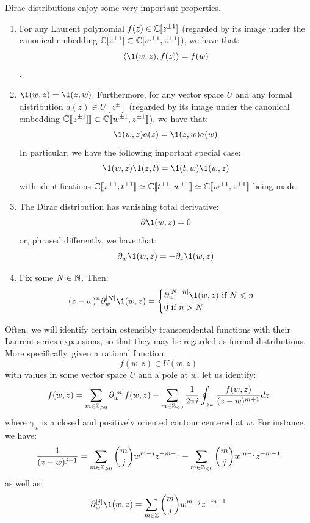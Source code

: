         \begin{lemma} \label{lemma: basic_properties_of_dirac_distributions}
            Dirac distributions enjoy some very important properties.
            \begin{enumerate}
                \item For any Laurent polynomial $f(z) \in \mathbb{C}[z^{\pm 1}]$ (regarded by its image under the canonical embedding $\mathbb{C}[z^{\pm 1}] \subset \mathbb{C}[w^{\pm 1}, z^{\pm 1}]$), we have that:
                    $$\< \1(w, z), f(z) \> = f(w)$$.
                \item $\1(w, z) = \1(z, w)$. Furthermore, for any vector space $U$ and any formal distribution $a(z) \in U[z^{\pm}]$ (regarded by its image under the canonical embedding $\mathbb{C}[\![z^{\pm 1}]]\!] \subset \mathbb{C}[\![w^{\pm 1}, z^{\pm 1}]\!]$), we have that:
                    $$\1(w, z) a(z) = \1(z, w) a(w)$$
                In particular, we have the following important special case:
                    $$\1(w, z) \1(z, t) = \1(t, w) \1(w, z)$$
                with identifications $\mathbb{C}[\![z^{\pm 1}, t^{\pm 1}]\!] \simeq \mathbb{C}[\![t^{\pm 1}, w^{\pm 1}]\!] \simeq \mathbb{C}[\![w^{\pm 1}, z^{\pm 1}]\!]$ being made.
                \item The Dirac distribution has vanishing total derivative:
                    $$\del \1(w, z) = 0$$
                or, phrased differently, we have that:
                    $$\del_w \1(w, z) = -\del_z \1(w, z)$$
                \item Fix some $N \in \mathbb{N}$. Then:
                    $$
                        (z - w)^n \del_w^{[N]} \1(w, z) =
                        \begin{cases}
                            \text{$\del_w^{[N - n]} \1(w, z)$ if $N \leq n$}
                            \\
                            \text{$0$ if $n > N$}
                        \end{cases}
                    $$
            \end{enumerate}
        \end{lemma}

        Often, we will identify certain ostensibly transcendental functions with their Laurent series expansions, so that they may be regarded as formal distributions. More specifically, given a rational function:
            $$f(w, z) \in U(w, z)$$
        with values in some vector space $U$ and a  pole at $w$, let us identify:
            $$f(w, z) = \sum_{m \in \mathbb{Z}_{\geqslant 0}} \partial_w^{[m]} f(w, z) + \sum_{m \in \mathbb{Z}_{< 0}} \frac{1}{2\pi i} \oint_{\gamma_w} \frac{f(w, z)}{(z - w)^{m + 1}} dz$$
        where $\gamma_w$ is a closed and positively oriented contour centered at $w$. For instance, we have:
            $$\frac{1}{(z - w)^{j + 1}} = \sum_{m \in \mathbb{Z}_{\geqslant 0}} \binom{m}{j} w^{m - j} z^{-m - 1} - \sum_{m \in \mathbb{Z}_{< 0}} \binom{m}{j} w^{m - j} z^{-m - 1}$$
        as well as:
            $$\del_w^{[j]} \1(w, z) = \sum_{m \in \Z} \binom{m}{j} w^{m - j} z^{-m - 1}$$
    
